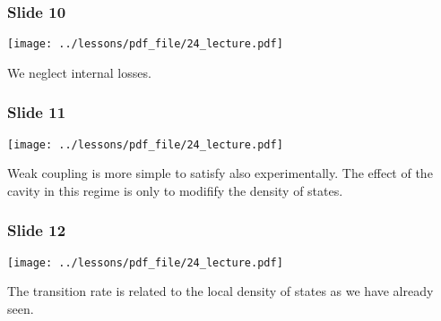 \documentclass[../main/main.tex]{subfiles}
\begin{document}
\subsubsection*{Slide 10}

\begin{minipage}[]{0.5\linewidth}
\centering
\texttt{[image: ../lessons/pdf\_file/24\_lecture.pdf]}
\end{minipage}
\hspace{0.3cm}\vspace{0.3cm}
\begin{minipage}[c]{0.47\linewidth}

We neglect internal losses.

\end{minipage}

\subsubsection*{Slide 11}

\begin{minipage}[]{0.5\linewidth}
\centering
\texttt{[image: ../lessons/pdf\_file/24\_lecture.pdf]}
\end{minipage}
\hspace{0.3cm}\vspace{0.3cm}
\begin{minipage}[c]{0.47\linewidth}

Weak coupling is more simple to satisfy also experimentally. The effect of the cavity in this regime is only to modifify the density of states.

\end{minipage}

\subsubsection*{Slide 12}

\begin{minipage}[]{0.5\linewidth}
\centering
\texttt{[image: ../lessons/pdf\_file/24\_lecture.pdf]}
\end{minipage}
\hspace{0.3cm}\vspace{0.3cm}
\begin{minipage}[c]{0.47\linewidth}

The transition rate is related to the local density of states as we have already seen.

\end{minipage}
\end{document}

